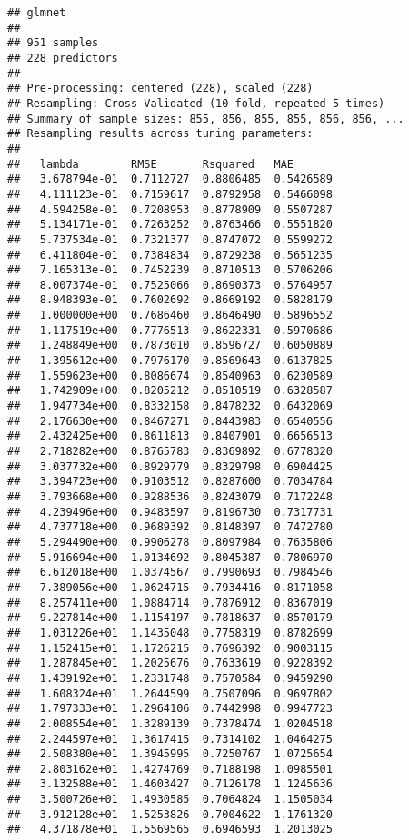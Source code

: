 \documentclass[]{article}
\begin{document}
\begin{verbatim}
## glmnet 
## 
## 951 samples
## 228 predictors
## 
## Pre-processing: centered (228), scaled (228) 
## Resampling: Cross-Validated (10 fold, repeated 5 times) 
## Summary of sample sizes: 855, 856, 855, 855, 856, 856, ... 
## Resampling results across tuning parameters:
## 
##   lambda        RMSE       Rsquared   MAE      
##   3.678794e-01  0.7112727  0.8806485  0.5426589
##   4.111123e-01  0.7159617  0.8792958  0.5466098
##   4.594258e-01  0.7208953  0.8778909  0.5507287
##   5.134171e-01  0.7263252  0.8763466  0.5551820
##   5.737534e-01  0.7321377  0.8747072  0.5599272
##   6.411804e-01  0.7384834  0.8729238  0.5651235
##   7.165313e-01  0.7452239  0.8710513  0.5706206
##   8.007374e-01  0.7525066  0.8690373  0.5764957
##   8.948393e-01  0.7602692  0.8669192  0.5828179
##   1.000000e+00  0.7686460  0.8646490  0.5896552
##   1.117519e+00  0.7776513  0.8622331  0.5970686
##   1.248849e+00  0.7873010  0.8596727  0.6050889
##   1.395612e+00  0.7976170  0.8569643  0.6137825
##   1.559623e+00  0.8086674  0.8540963  0.6230589
##   1.742909e+00  0.8205212  0.8510519  0.6328587
##   1.947734e+00  0.8332158  0.8478232  0.6432069
##   2.176630e+00  0.8467271  0.8443983  0.6540556
##   2.432425e+00  0.8611813  0.8407901  0.6656513
##   2.718282e+00  0.8765783  0.8369892  0.6778320
##   3.037732e+00  0.8929779  0.8329798  0.6904425
##   3.394723e+00  0.9103512  0.8287600  0.7034784
##   3.793668e+00  0.9288536  0.8243079  0.7172248
##   4.239496e+00  0.9483597  0.8196730  0.7317731
##   4.737718e+00  0.9689392  0.8148397  0.7472780
##   5.294490e+00  0.9906278  0.8097984  0.7635806
##   5.916694e+00  1.0134692  0.8045387  0.7806970
##   6.612018e+00  1.0374567  0.7990693  0.7984546
##   7.389056e+00  1.0624715  0.7934416  0.8171058
##   8.257411e+00  1.0884714  0.7876912  0.8367019
##   9.227814e+00  1.1154197  0.7818637  0.8570179
##   1.031226e+01  1.1435048  0.7758319  0.8782699
##   1.152415e+01  1.1726215  0.7696392  0.9003115
##   1.287845e+01  1.2025676  0.7633619  0.9228392
##   1.439192e+01  1.2331748  0.7570584  0.9459290
##   1.608324e+01  1.2644599  0.7507096  0.9697802
##   1.797333e+01  1.2964106  0.7442998  0.9947723
##   2.008554e+01  1.3289139  0.7378474  1.0204518
##   2.244597e+01  1.3617415  0.7314102  1.0464275
##   2.508380e+01  1.3945995  0.7250767  1.0725654
##   2.803162e+01  1.4274769  0.7188198  1.0985501
##   3.132588e+01  1.4603427  0.7126178  1.1245636
##   3.500726e+01  1.4930585  0.7064824  1.1505034
##   3.912128e+01  1.5253826  0.7004622  1.1761320
##   4.371878e+01  1.5569565  0.6946593  1.2013025

\end{verbatim}
\end{document}
